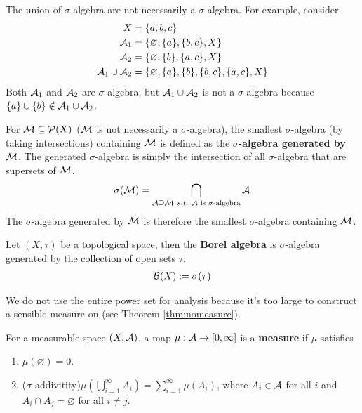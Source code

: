 \documentclass[11pt]{article}
\newcommand{\s}[0]{$\sigma$}
\begin{document}
	\begin{remark}
		The union of \s-algebra are not necessarily a \s-algebra. For example, consider
		\begin{align}
			X &= \{a, b, c\} \\
			\mathcal{{A}}_1 &= \{\varnothing, \{a\}, \{b, c\}, X\} \\
			\mathcal{{A}}_2 &= \{\varnothing, \{b\}, \{a, c\}, X\} \\
			\mathcal{{A}}_1 \cup \mathcal{{A}}_2 &= \{\varnothing, \{a\}, \{b\}, \{b, c\}, \{a, c\}, X\}
		\end{align}
		Both $\mathcal{{A}}_1$ and $\mathcal{{A}}_2$ are \s-algebra, but $\mathcal{{A}}_1 \cup \mathcal{{A}}_2$ is not a \s-algebra because $\{a\} \cup \{b\} \notin \mathcal{{A}}_1 \cup \mathcal{{A}}_2$.
	\end{remark}
	
	\begin{definition}
		For $\mathcal{{M}} \subseteq \mathcal{{P}}(X)$ ($\mathcal{{M}}$ is not necessarily a $\sigma$-algebra), the smallest $\sigma$-algebra (by taking intersections) containing $\mathcal{{M}}$ is defined as the \textbf{$\sigma$-algebra generated by $\mathcal{{M}}$}.
		The generated $\sigma$-algebra is simply the intersection of all $\sigma$-algebra that are supersets of $\mathcal{{M}}$.
		\begin{align}
			\sigma(\mc{M}) = \bigcap_{\mc{A} \supseteq \mc{M}\ s.t.\ \mc{A}\tx{ is $\sigma$-algebra}} \mc{A}
		\end{align}
		The \s-algebra generated by $\mathcal{{M}}$ is therefore the smallest \s-algebra containing $\mathcal{{M}}$.
	\end{definition}
	
	\begin{definition}
		Let $(X, \tau)$ be a topological space, then the \textbf{Borel algebra} is $\sigma$-algebra generated by the collection of open sets $\tau$.
		\begin{align}
			\mathcal{{B}}(X) := \sigma(\tau)
		\end{align}
	\end{definition}
	
	\begin{remark}
		We do not use the entire power set for analysis because it's too large to construct a sensible measure on (see Theorem \ref{thm:nomeasure}).
	\end{remark}
	
	\begin{definition}
		For a measurable space $(X, \mathcal{{A}})$, a map $\mu:\mathcal{{A}} \to [0, \infty]$ is a \textbf{measure} if $\mu$ satisfies
		\begin{enumerate}
			\item $\mu(\varnothing) = 0$.
			\item (\s-addivitity)$\mu\left(\bigcup_{i=1}^\infty A_i\right) = \sum_{i=1}^\infty \mu(A_i)$, where $A_i \in \mathcal{{A}}$ for all $i$ and $A_i \cap A_j = \varnothing$ for all $i \neq j$.
		\end{enumerate}
	\end{definition}
	
\end{document}
